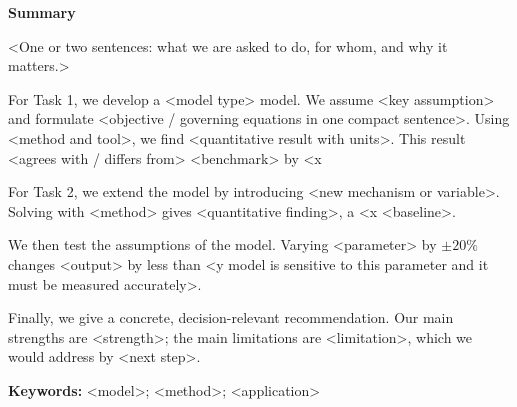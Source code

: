 \documentclass[12pt]{article}
\begin{document}
\thispagestyle{fancy}
\begin{center}
  {\large\bfseries Summary}
\end{center}

<One or two sentences: what we are asked to do, for whom, and why it matters.>

For Task 1, we develop a <model type> model. We assume <key assumption> and
formulate <objective / governing equations in one compact sentence>. Using
<method and tool>, we find <quantitative result with units>. This result
<agrees with / differs from> <benchmark> by <x%

For Task 2, we extend the model by introducing <new mechanism or variable>.
Solving with <method> gives <quantitative finding>, a <x%
<baseline>.

We then test the assumptions of the model. Varying <parameter> by $\pm 20\%$
changes <output> by less than <y%
model is sensitive to this parameter and it must be measured accurately>.

Finally, we give a concrete, decision-relevant recommendation. Our main
strengths are <strength>; the main limitations are <limitation>, which we
would address by <next step>.

\vspace{0.6em}
\noindent\textbf{Keywords:} <model>; <method>; <application>

\newpage

\end{document}

